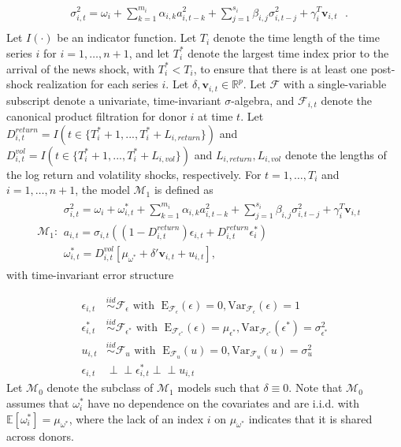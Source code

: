 \documentclass[11pt,3p,review,authoryear]{elsarticle}
\newcommand{\x}{\textbf{v}}
\newcommand{\simiid}{\stackrel{iid}{\sim}} %
\newcommand{\indep}{\perp \!\!\! \perp } %
\def\mrm#1{\mathrm{#1}} %
\def\mc#1{\mathcal{#1}} %
\def\E{\mathbb{E}} %
\def\mc#1{\mathcal{#1}}
\theoremstyle{definition}
\begin{document}
\begin{align*}
&\sigma_{i,t}^{2} = \omega_{i} + \sum^{m_{i}}_{k=1}\alpha_{i,k}a^{2}_{i,t-k} + \sum_{j=1}^{s_{i}}\beta_{i,j}\sigma_{i,t-j}^{2} + \gamma_{i}^{T} \x_{i,t} \text{ }. \\
\end{align*}
Let $I(\cdot)$ be an indicator function.  Let $T_i$ denote the time length of the time series $i$ for $i = 1, \ldots, n+1$, and let $T_i^*$ denote the largest time index prior to the arrival of the news shock, with $T_i^* < T_i$, to ensure that there is at least one post-shock realization for each series $i$.  Let $\delta, \x_{i,t} \in \mathbb{R}^{p}$.  Let $\mathcal{F}$ with a single-variable subscript denote a univariate, time-invariant $\sigma$-algebra, and $\mathcal{F}_{i,t}$ denote the canonical product filtration for donor $i$ at time $t$.  Let $D^{return}_{i,t} = I(t \in \{T_i^* + 1,...,T_i^* + L_{i, return}\})$ and $D^{vol}_{i,t} = I(t \in \{T_i^* + 1,...,T_i^* + L_{i, vol}\})$ and $L_{i,return},L_{i,vol}$ denote the lengths of the log return and volatility shocks, respectively.  For $t= 1, \ldots, T_i$ and $i = 1, \ldots, n+1$, the model $\mc{M}_1$ is defined as 
\begin{align*}
  \mc{M}_1 \colon \begin{array}{l}
     \sigma^{2}_{i,t} = \omega_{i} + \omega^{*}_{i,t} + \sum^{m_{i}}_{k=1}\alpha_{i,k}a^{2}_{i,t-k} + \sum_{j=1}^{s_{i}}\beta_{i,j}\sigma_{i,t-j}^{2} + \gamma_{i}^{T} \x_{i,t} \text{ }\\[.2cm]
     a_{i,t} = \sigma_{i,t}((1-D^{return}_{i,t})\epsilon_{i,t} + D^{return}_{i,t}\epsilon^{*}_{i})\\[.2cm]
    \omega_{i,t}^{*} = D^{vol}_{i,t}[\mu_{\omega^{*}}+\delta'\x_{i,t}+ u_{i,t}],
  \end{array}
  \end{align*}
with time-invariant error structure

  \begin{align*}
    \epsilon_{i,t} &\simiid \mc{F}_{\epsilon} \text{ with }  \; \mrm{E}_{\mc{F}_{\epsilon}}(\epsilon) = 0, \mrm{Var}_{\mc{F}_{\epsilon}}(\epsilon)  = 1  \\
    \epsilon^{*}_{i,t} &\simiid \mc{F}_{\epsilon^{*}} \text{ with }  \; \mrm{E}_{\mc{F}_{\epsilon^{*}}}(\epsilon) = \mu_{\epsilon^{*}}, \mrm{Var}_{\mc{F}_{\epsilon^{*}}}(\epsilon^{*})  = \sigma^2_{\epsilon^{*}}  \\
    u_{i,t} & \simiid  \mc{F}_{u} \text{ with }  \; \mrm{E}_{\mc{F}_{u}}(u) = 0, \mrm{Var}_{\mc{F}_{u}}(u) = \sigma^2_{u}\\
    \epsilon_{i,t} & \indep  \epsilon^{*}_{i,t}  \indep u_{i,t}
    \end{align*}
Let $\mc{M}_{0}$ denote the subclass of $\mc{M}_{1}$ models such that $\delta \equiv 0$.  Note that $\mc{M}_{0}$ assumes that $\omega^{*}_i$ have no dependence on the covariates and are i.i.d. with $\E[ \omega^{*}_i]=\mu_{\omega^{*}}$, where the lack of an index $i$ on $\mu_{\omega^{*}}$ indicates that it is shared across donors.
    
\end{document}
